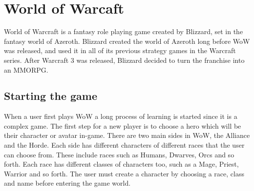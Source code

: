 



\section{World of Warcaft} %

World of Warcraft is a fantasy role playing game created by Blizzard, set in the fantasy world of Azeroth. Blizzard created the world of Azeroth long before WoW was released, and used it in all of its previous strategy games in the Warcraft series. After Warcraft 3 was released, Blizzard decided to turn the franchise into an MMORPG.

\subsection{Starting the game}
When a user first plays WoW a long process of learning is started since it is a complex game. The first step for a new player is to choose a hero which will be their character or avatar in-game. There are two main sides in WoW, the Alliance and the Horde. Each side has different characters of different races that the user can choose from. These include races such as Humans, Dwarves, Orcs and so forth.
Each race has different classes of characters too, such as a Mage, Priest, Warrior and so forth. The user must create a character by choosing a race, class and name before entering the game world.

